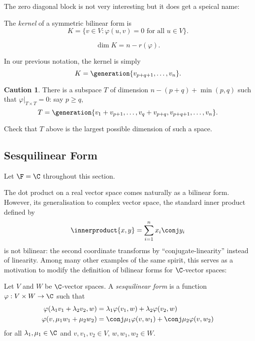 \documentclass[a4paper]{article}
\newcommand*{\spans}{\generation}
\newcommand*{\ip}{\innerproduct}
\theoremstyle{definition}
\newtheorem*{caution}{Caution}
\begin{document}
The zero diagonal block is not very interesting but it does get a speical name:

\begin{definition}
  The \emph{kernel} of a symmetric bilinear form is
  \[
    K = \{ v \in V: \varphi(u, v) = 0 \text{ for all } u \in V\}.
  \]
\end{definition}

\begin{note}
  \[
    \dim K = n - r(\varphi).
  \]
\end{note}

In our previous notation, the kernel is simply
\[
  K = \spans{v_{p + q + 1}, \dots, v_n}.
\]

\begin{caution}
  There is a subspace \(T\) of dimension \(n - (p + q) + \min(p, q)\) such that \(\varphi|_{T \times T} = 0\): say \(p \geq q\),
  \[
    T = \spans{v_1 + v_{p + 1}, \dots, v_q + v_{p + q}, v_{p + q + 1}, \dots, v_n}.
  \]
\end{caution}

\begin{ex}
  Check that \(T\) above is the largest possible dimension of such a space.
\end{ex}

\subsection{Sesquilinear Form}

Let \(\F = \C\) throughout this section.

The dot product on a real vector space comes naturally as a bilinear form. However, its generalisation to complex vector space, the standard inner product defined by
\[
  \ip{x, y} = \sum_{i = 1}^{n} x_i \conj y_i
\]
is not bilinear: the second coordinate transforms by ``conjugate-linearity'' instead of linearity. Among many other examples of the same spirit, this serves as a motivation to modify the definition of bilinear forms for \(\C\)-vector spaces:

\begin{definition}
  Let \(V\) and \(W\) be \(\C\)-vector spaces. A \emph{sesquilinear form} is a function \(\varphi: V \times W \to \C\) such that
  \begin{align*}
    \varphi(\lambda_1v_1 + \lambda_2v_2, w) &= \lambda_1 \varphi(v_1, w) + \lambda_2 \varphi(v_2, w) \\
    \varphi(v, \mu_1w_1 + \mu_2w_2) &= \conj \mu_1 \varphi(v, w_1) + \conj \mu_2 \varphi(v, w_2)
  \end{align*}
  for all \(\lambda_1, \mu_1 \in \C\) and \(v, v_1, v_2 \in V\), \(w, w_1, w_2 \in W\).
\end{definition}
\end{document}
